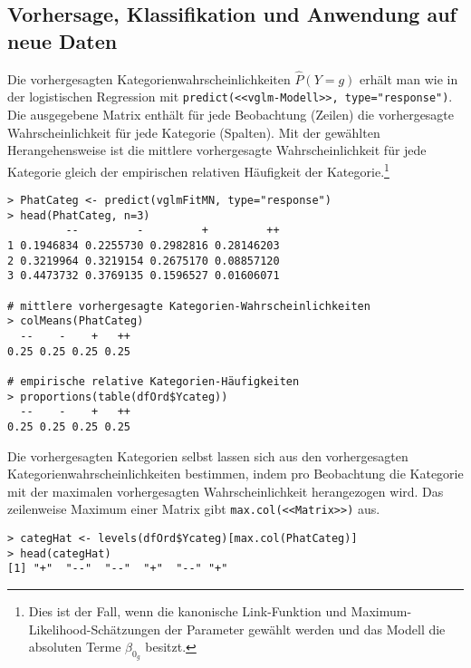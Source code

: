 \subsection{Vorhersage, Klassifikation und Anwendung auf neue Daten}

Die vorhergesagten Kategorienwahrscheinlichkeiten $\hat{P}(Y = g)$ erhält man wie in der logistischen Regression mit \lstinline!predict(<<vglm-Modell>>, type="response")!. Die ausgegebene Matrix enthält für jede Beobachtung (Zeilen) die vorhergesagte Wahrscheinlichkeit für jede Kategorie (Spalten). Mit der gewählten Herangehensweise ist die mittlere vorhergesagte Wahrscheinlichkeit für jede Kategorie gleich der empirischen relativen Häufigkeit der Kategorie.\footnote{Dies ist der Fall, wenn die kanonische Link-Funktion und Maximum-Likelihood-Schätzungen der Parameter gewählt werden und das Modell die absoluten Terme $\beta_{0_{g}}$ besitzt.}
\begin{lstlisting}
> PhatCateg <- predict(vglmFitMN, type="response")
> head(PhatCateg, n=3)
         --         -         +         ++
1 0.1946834 0.2255730 0.2982816 0.28146203
2 0.3219964 0.3219154 0.2675170 0.08857120
3 0.4473732 0.3769135 0.1596527 0.01606071

# mittlere vorhergesagte Kategorien-Wahrscheinlichkeiten
> colMeans(PhatCateg)
  --    -    +   ++
0.25 0.25 0.25 0.25

# empirische relative Kategorien-Häufigkeiten
> proportions(table(dfOrd$Ycateg))
  --    -    +   ++
0.25 0.25 0.25 0.25
\end{lstlisting}

Die vorhergesagten Kategorien selbst lassen sich aus den vorhergesagten Kategorienwahrscheinlichkeiten bestimmen, indem pro Beobachtung die Kategorie mit der maximalen vorhergesagten Wahrscheinlichkeit herangezogen wird. Das zeilenweise Maximum einer Matrix gibt \lstinline!max.col(<<Matrix>>)! aus.
\begin{lstlisting}
> categHat <- levels(dfOrd$Ycateg)[max.col(PhatCateg)]
> head(categHat)
[1] "+"  "--"  "--"  "+"  "--" "+"
\end{lstlisting}

